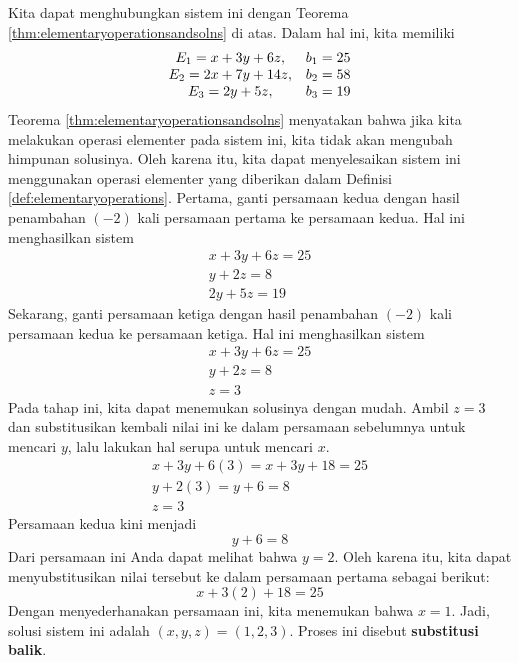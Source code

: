 \begin{solution}
Kita dapat menghubungkan sistem ini dengan Teorema \ref{thm:elementaryoperationsandsolns} di atas. Dalam hal ini, kita memiliki
\begin{equation*}
\begin{array}{c c}
E_{1} = x + 3y + 6z, & b_{1} = 25\\
E_{2} = 2x+7y+14z, & b_{2} = 58 \\
E_{3} = 2y+5z, & b_{3} = 19 
\end{array}
\end{equation*}
Teorema \ref{thm:elementaryoperationsandsolns} menyatakan bahwa jika kita melakukan operasi elementer pada sistem ini,
kita tidak akan mengubah himpunan solusinya. Oleh karena itu,
kita dapat menyelesaikan sistem ini menggunakan operasi elementer yang diberikan dalam Definisi \ref{def:elementaryoperations}.
Pertama, ganti persamaan kedua dengan hasil penambahan $\left( -2\right)$
kali persamaan pertama ke persamaan kedua. Hal ini menghasilkan sistem
\begin{equation}
\begin{array}{c}
x+3y+6z=25 \\
y+2z=8 \\
2y+5z=19
\end{array}
\label{solvingasystem2}
\end{equation}
Sekarang, ganti persamaan ketiga dengan hasil penambahan $\left( -2\right) $ kali
persamaan kedua ke persamaan ketiga. Hal ini menghasilkan sistem
\begin{equation}
\begin{array}{c}
x+3y+6z=25 \\
y+2z=8 \\
z=3
\end{array}
\label{solvingasystem3}
\end{equation}
Pada tahap ini, kita dapat menemukan solusinya dengan mudah. Ambil $z=3$ dan substitusikan kembali nilai ini ke dalam
 persamaan sebelumnya untuk mencari $y$, lalu lakukan hal serupa untuk mencari $x$.
\begin{equation*}
\begin{array}{c}
x + 3y + 6 \left(3 \right) = x + 3y + 18 = 25\\
y + 2 \left(3 \right) = y + 6 = 8 \\
z = 3
\end{array}
\end{equation*}
Persamaan kedua kini menjadi
\begin{equation*}
y+6=8
\end{equation*}
Dari persamaan ini Anda dapat melihat bahwa $y = 2$. Oleh karena itu, kita dapat menyubstitusikan nilai tersebut ke dalam persamaan pertama sebagai berikut:
\begin{equation*}
x + 3 \left(2 \right) + 18 = 25
\end{equation*}
Dengan menyederhanakan persamaan ini, kita menemukan bahwa $x=1$.
Jadi, solusi sistem ini adalah $\left( x,y,z \right) = \left( 1,2,3 \right)$.
Proses ini disebut \textbf{substitusi balik}. 


\end{solution}
